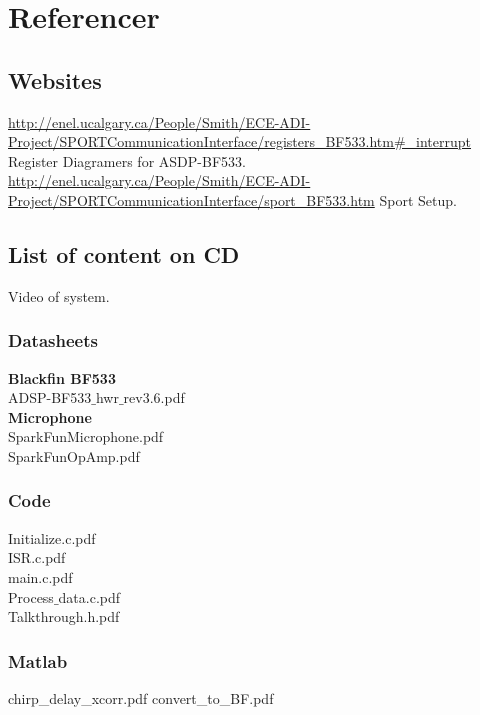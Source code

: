 \chapter{Referencer}
\section{Websites}
\url{http://enel.ucalgary.ca/People/Smith/ECE-ADI-Project/SPORTCommunicationInterface/registers_BF533.htm#_interrupt}
Register Diagramers for ASDP-BF533.\\
\url{http://enel.ucalgary.ca/People/Smith/ECE-ADI-Project/SPORTCommunicationInterface/sport_BF533.htm}
Sport Setup.\\

\section{List of content on CD}
Video of system.

\subsection{Datasheets} 
\textbf{Blackfin BF533}\\
ADSP-BF533$\_$hwr$\_$rev3.6.pdf\\
\textbf{Microphone}\\
SparkFunMicrophone.pdf\\
SparkFunOpAmp.pdf\\


\subsection{Code}
Initialize.c.pdf\\
ISR.c.pdf\\
main.c.pdf\\
Process$\_$data.c.pdf\\
Talkthrough.h.pdf\\

\subsection{Matlab}
chirp_delay_xcorr.pdf
convert_to_BF.pdf